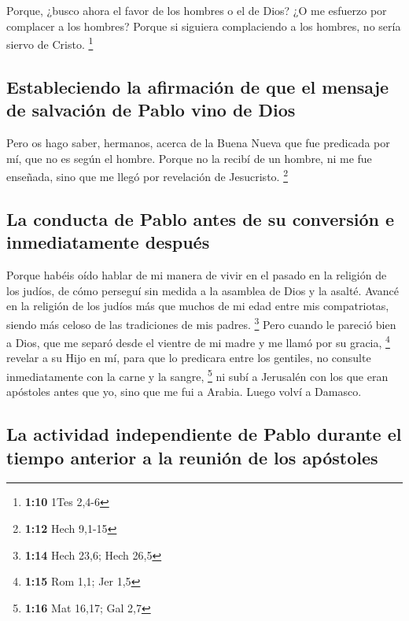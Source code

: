\begin{paracol}{2}
 Porque, ¿busco ahora el favor de los hombres o el de
Dios? ¿O me esfuerzo por complacer a los hombres? Porque si siguiera
complaciendo a los hombres, no sería siervo de Cristo. \footnote{\textbf{1:10}
  1Tes 2,4-6}

\hypertarget{estableciendo-la-afirmaciuxf3n-de-que-el-mensaje-de-salvaciuxf3n-de-pablo-vino-de-dios}{%
\subsection{Estableciendo la afirmación de que el mensaje de salvación
de Pablo vino de
Dios}\label{estableciendo-la-afirmaciuxf3n-de-que-el-mensaje-de-salvaciuxf3n-de-pablo-vino-de-dios}}

 Pero os hago saber, hermanos, acerca de la Buena Nueva
que fue predicada por mí, que no es según el hombre. 
Porque no la recibí de un hombre, ni me fue enseñada, sino que me llegó
por revelación de Jesucristo. \footnote{\textbf{1:12} Hech 9,1-15}

\hypertarget{la-conducta-de-pablo-antes-de-su-conversiuxf3n-e-inmediatamente-despuuxe9s}{%
\subsection{La conducta de Pablo antes de su conversión e inmediatamente
después}\label{la-conducta-de-pablo-antes-de-su-conversiuxf3n-e-inmediatamente-despuuxe9s}}

 Porque habéis oído hablar de mi manera de vivir en el
pasado en la religión de los judíos, de cómo perseguí sin medida a la
asamblea de Dios y la asalté.  Avancé en la religión de
los judíos más que muchos de mi edad entre mis compatriotas, siendo más
celoso de las tradiciones de mis padres. \footnote{\textbf{1:14} Hech
  23,6; Hech 26,5}  Pero cuando le pareció bien a Dios,
que me separó desde el vientre de mi madre y me llamó por su gracia,
\footnote{\textbf{1:15} Rom 1,1; Jer 1,5}  \,revelar a su
Hijo en mí, para que lo predicara entre los gentiles, no consulte
inmediatamente con la carne y la sangre, \footnote{\textbf{1:16} Mat
  16,17; Gal 2,7}  ni subí a Jerusalén con los que eran
apóstoles antes que yo, sino que me fui a Arabia. Luego volví a Damasco.

\hypertarget{la-actividad-independiente-de-pablo-durante-el-tiempo-anterior-a-la-reuniuxf3n-de-los-apuxf3stoles}{%
\subsection{La actividad independiente de Pablo durante el tiempo
anterior a la reunión de los
apóstoles}\label{la-actividad-independiente-de-pablo-durante-el-tiempo-anterior-a-la-reuniuxf3n-de-los-apuxf3stoles}}


\end{paracol}
